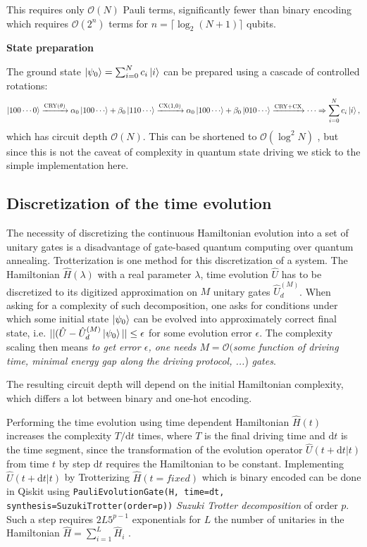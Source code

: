 \documentclass[%
nofootinbib,
 amsmath,amssymb,
 aps,
 prd,
10pt]{revtex4-2}
\renewcommand{\d}{\ensuremath{\mathrm{d}}}
\renewcommand{\O}{\mathcal{O}}
\renewcommand{\H}{\hat{H}} %
\begin{document}
This requires only $\O(N)$ Pauli terms, significantly fewer than binary encoding which requires $\O(2^n)$ terms for $n = \lceil \log_2(N+1) \rceil$ qubits\cite{Matteo21}.



\textbf{State preparation}

The ground state $\ket{\psi_0} = \sum_{i=0}^{N} c_i \ket{i}$ can be prepared using a cascade of controlled rotations:
\begin{equation}
    \ket{100\cdots0} \xrightarrow{\text{CRY}(\theta)} \alpha_0\ket{100\cdots} + \beta_0\ket{110\cdots} \xrightarrow{\text{CX(1,0)}} \alpha_0\ket{100\cdots} + \beta_0\ket{010\cdots} \xrightarrow{\text{CRY+CX}} \cdots \Rightarrow \sum_{i=0}^{N} c_i \ket{i},
\end{equation}
which has circuit depth $\O(N)$. This can be shortened to $\O(\log^2 N)$ \cite{Chen24}, but since this is not the caveat of complexity in quantum state driving we stick to the simple implementation here.





\subsection{Discretization of the time evolution}
\label{sec:time_evolution}
The necessity of discretizing the continuous Hamiltonian evolution into a set of unitary gates is a disadvantage of gate-based quantum computing over quantum annealing. Trotterization is one method for this discretization of a system. The Hamiltonian $\hat H(\lambda)$ with a real parameter $\lambda$, time evolution $\hat U$ has to be discretized to its digitized approximation on $M$ unitary gates $\hat U_d^{(M)}$. When asking for a complexity of such decomposition, one asks for conditions under which some initial state $\ket{\psi_0}$ can be evolved into approximately correct final state, i.e. $||(\hat U-\hat U_d^{(M)}\ket{\psi_0}|| \leq \epsilon$ for some evolution error $\epsilon$. The complexity scaling then means \emph{to get error $\epsilon$, one needs $M= \O($\textit{some function of driving time, minimal energy gap along the driving protocol, ...}}) \emph{gates}.

The resulting circuit depth will depend on the initial Hamiltonian complexity, which differs a lot between binary and one-hot encoding.

Performing the time evolution using time dependent Hamiltonian $\H(t)$ increases the complexity $T/\d t$ times, where $T$ is the final driving time and $\d t$ is the time segment, since the transformation of the evolution operator $\hat U(t+\d t|t)$ from time $t$ by step $\d t$ requires the Hamiltonian to be constant.
Implementing $\hat U(t+\d t|t)$ by Trotterizing $\H(t=fixed)$ which is binary encoded can be done in Qiskit using \texttt{PauliEvolutionGate(H, time=dt, synthesis=SuzukiTrotter(order=p))} \emph{Suzuki Trotter decomposition} of order $p$. Such a step requires $2L 5^{p-1}$ exponentials for $L$ the number of unitaries in the Hamiltonian $\H=\sum_{i=1}^L \H_i$ \cite{Wiebe10}.
\end{document}
